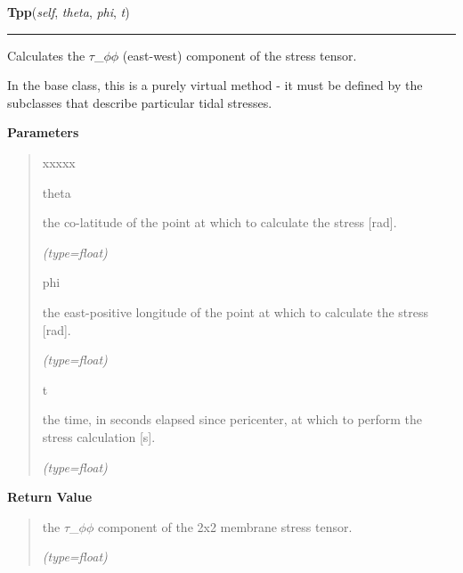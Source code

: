     \label{satstress:SatStress:StressDef:Tpp}

    \vspace{0.5ex}

\hspace{.8\funcindent}\begin{boxedminipage}{\funcwidth}

    \raggedright \textbf{Tpp}(\textit{self}, \textit{theta}, \textit{phi}, \textit{t})

    \vspace{-1.5ex}

    \rule{\textwidth}{0.5\fboxrule}
\setlength{\parskip}{2ex}
    Calculates the \(\tau\)\_\(\phi\)\(\phi\) (east-west) component of the 
    stress tensor.

    In the base class, this is a purely virtual method - it must be defined
    by the subclasses that describe particular tidal stresses.

\setlength{\parskip}{1ex}
      \textbf{Parameters}
      \vspace{-1ex}

      \begin{quote}
        \begin{Ventry}{xxxxx}

          \item[theta]

          the co-latitude of the point at which to calculate the stress 
          [rad].

            {\it (type=float)}

          \item[phi]

          the east-positive longitude of the point at which to calculate 
          the stress [rad].

            {\it (type=float)}

          \item[t]

          the time, in seconds elapsed since pericenter, at which to 
          perform the stress calculation [s].

            {\it (type=float)}

        \end{Ventry}

      \end{quote}

      \textbf{Return Value}
    \vspace{-1ex}

      \begin{quote}
      the \(\tau\)\_\(\phi\)\(\phi\) component of the 2x2 membrane stress 
      tensor.

      {\it (type=float)}

      \end{quote}

    \end{boxedminipage}

